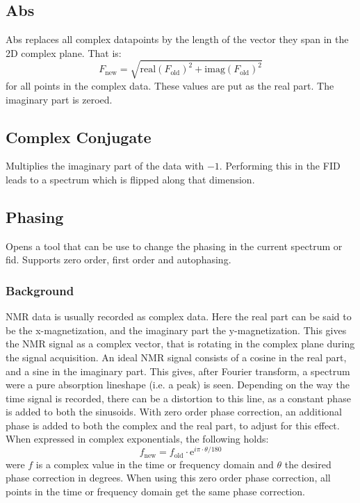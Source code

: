 \documentclass[11pt,a4paper]{article}
\begin{document}
\subsection{Abs}
Abs replaces all complex datapoints by the length of the vector they span in the 2D complex plane. That is:
\begin{equation*}
F_\text{new} = \sqrt{\text{real}(F_\text{old})^2 + \text{imag}(F_\text{old})^2}
\end{equation*}
for all points in the complex data. These values are put as the real part. The imaginary part is zeroed.



\subsection{Complex Conjugate}
Multiplies the imaginary part of the data with $-1$. Performing this in the FID leads to a spectrum which is flipped along that dimension.


\subsection{Phasing}
Opens a tool that can be use to change the phasing in the current spectrum or fid. Supports zero order, first order and autophasing.

\subsubsection*{Background}
NMR data is usually recorded as complex data. Here the real part can be said to be the x-magnetization, and the imaginary part the y-magnetization. This gives the NMR signal as a complex vector, that is rotating in the complex plane during the signal acquisition. An ideal NMR signal consists of a cosine in the real part, and a sine in the imaginary part. This gives, after Fourier transform, a spectrum were a pure absorption lineshape (i.e. a peak) is seen. Depending on the way the time signal is recorded, there can be a distortion to this line, as a constant phase is added to both the sinusoids. With zero order phase correction, an additional phase is added to both the complex and the real part, to adjust for this effect. When expressed in complex exponentials, the following holds:
\begin{equation}
f_\text{new} = f_\text{old}\cdot\text{e}^{i\pi\cdot\theta/180} 
\end{equation}
were $f$ is a complex value in the time or frequency domain and $\theta$ the desired phase correction in degrees. When using this zero order phase correction, all points in the time or frequency domain get the same phase correction.
\end{document}
